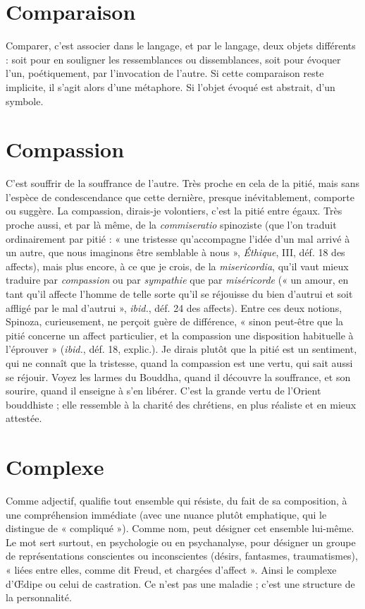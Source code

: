 \section{Comparaison}
Comparer, c’est associer dans le langage, et par le langage,
deux objets différents : soit pour en souligner les ressemblances
ou dissemblances, soit pour évoquer l’un, poétiquement, par l’invocation
de l’autre. Si cette comparaison reste implicite, il s’agit alors d’une métaphore.
Si l’objet évoqué est abstrait, d’un symbole.

\section{Compassion}
C'est souffrir de la souffrance de l’autre. Très proche en
cela de la pitié, mais sans l’espèce de condescendance que
cette dernière, presque inévitablement, comporte ou suggère. La compassion,
dirais-je volontiers, c’est la pitié entre égaux. Très proche aussi, et par là même,
de la {\it commiseratio} spinoziste (que l’on traduit ordinairement par pitié : « une
tristesse qu’accompagne l’idée d’un mal arrivé à un autre, que nous imaginons
être semblable à nous », {\it Éthique}, III, déf. 18 des affects), mais plus encore, à ce
que je crois, de la {\it misericordia}, qu’il vaut mieux traduire par {\it compassion} ou par
{\it sympathie} que par {\it miséricorde} (« un amour, en tant qu’il affecte l’homme de
telle sorte qu’il se réjouisse du bien d’autrui et soit affligé par le mal d’autrui »,
{\it ibid.}, déf. 24 des affects). Entre ces deux notions, Spinoza, curieusement, ne
perçoit guère de différence, « sinon peut-être que la pitié concerne un affect
particulier, et la compassion une disposition habituelle à l’éprouver » ({\it ibid.},
déf. 18, explic.). Je dirais plutôt que la pitié est un sentiment, qui ne connaît
que la tristesse, quand la compassion est une vertu, qui sait aussi se réjouir.
Voyez les larmes du Bouddha, quand il découvre la souffrance, et son sourire,
quand il enseigne à s’en libérer. C’est la grande vertu de l'Orient bouddhiste ;
elle ressemble à la charité des chrétiens, en plus réaliste et en mieux attestée.

\section{Complexe}
Comme adjectif, qualifie tout ensemble qui résiste, du fait de
sa composition, à une compréhension immédiate (avec une
nuance plutôt emphatique, qui le distingue de « compliqué »). Comme nom,
peut désigner cet ensemble lui-même. Le mot sert surtout, en psychologie ou
en psychanalyse, pour désigner un groupe de représentations conscientes ou
inconscientes (désirs, fantasmes, traumatismes), « liées entre elles, comme dit
Freud, et chargées d’affect ». Ainsi le complexe d'Œdipe ou celui de castration.
Ce n’est pas une maladie ; c’est une structure de la personnalité.

